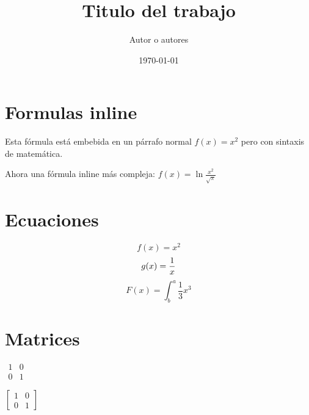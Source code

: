 \documentclass[
    a4paper,
    12pt
]{article}
\title{Titulo del trabajo}
\date{\today}
\author{Autor o autores}
\begin{document}
	\maketitle
	\begin{abstract}
		\lipsum[1-2]
	\end{abstract}

    \section{Formulas inline}
    
    Esta fórmula está embebida en un párrafo normal $f(x) = x^2$ pero con sintaxis de matemática.
    
    Ahora una fórmula inline más compleja: $f(x) = \ln \frac{x^2}{\sqrt{\pi}}$

    \section{Ecuaciones}
    
    \begin{equation}
        f(x) = x^2
    \end{equation}
    \begin{equation}
        g(x) = \frac{1}{x}\\
    \end{equation}
    \begin{equation}
        F(x) = \int^a_b \frac{1}{3}x^3
    \end{equation}

    \section{Matrices}
    
    $
    \begin{matrix}
        1 & 0\\
        0 & 1
    \end{matrix}
    $
    
    $
    \left[
    \begin{matrix}
        1 & 0\\
        0 & 1
    \end{matrix}
    \right]
    $
	
\end{document}
